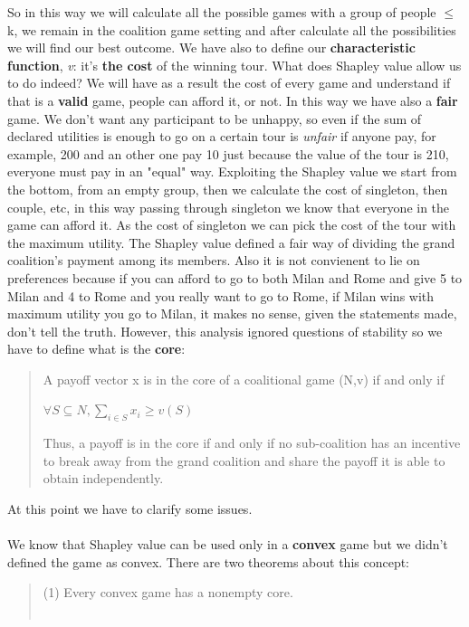 \documentclass{article}
\begin{document}
{So in this way we will calculate all the possible games with a group of people $\le$ k, we remain in the coalition game setting and after calculate all the possibilities we will find our best outcome. We have also to define our \textbf{characteristic function}, \textit{v}: it's \textbf{the cost} of the winning tour. What does Shapley value allow us to do indeed? We will have as a result the cost of every game and understand if that is a \textbf{valid} game, people can afford it, or not. In this way we have also a \textbf{fair} game. We don't want any participant to be unhappy, so even if the sum of declared utilities is enough to go on a certain tour is \textit{unfair} if anyone pay, for example, 200 and an other one pay 10 just because the value of the tour is 210, everyone must pay in an "equal" way. Exploiting the Shapley value we start from the bottom, from an empty group, then we calculate the cost of singleton, then couple, etc, in this way passing through singleton we know that everyone in the game can afford it. As the cost of singleton we can pick the cost of the tour with the maximum utility. The Shapley value defined a fair way of dividing the grand coalition’s payment among its members. Also it is not convienent to lie on preferences because if you can afford to go to both Milan and Rome and give 5 to Milan and 4 to Rome and you really want to go to Rome, if Milan wins with maximum utility you go to Milan, it makes no sense, given the statements made, don't tell the truth. However, this analysis ignored questions of stability so we have to define what is the \textbf{core}:
\begin{quote}
    A payoff vector x is in the core of a coalitional game (N,v) if and only if
    \begin{center}
        $\forall S \subseteq N, \displaystyle \sum_{i \in S} x_i \ge v(S)$
    \end{center}
    Thus, a payoff is in the core if and only if no sub-coalition has an incentive to break away from the grand coalition and share the payoff it is able to obtain independently.\\
\end{quote}
At this point we have to clarify some issues.\\\\
We know that Shapley value can be used only in a \textbf{convex} game but we didn't defined the game as convex. There are two theorems about this concept:
\begin{quote}
    (1) Every convex game has a nonempty core.\\\\

\end{quote}}
\end{document}
